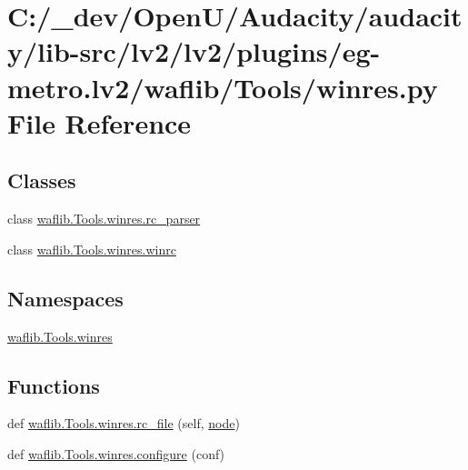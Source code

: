 \hypertarget{lv2_2plugins_2eg-metro_8lv2_2waflib_2_tools_2winres_8py}{}\section{C\+:/\+\_\+dev/\+Open\+U/\+Audacity/audacity/lib-\/src/lv2/lv2/plugins/eg-\/metro.lv2/waflib/\+Tools/winres.py File Reference}
\label{lv2_2plugins_2eg-metro_8lv2_2waflib_2_tools_2winres_8py}
\subsection*{Classes}
\begin{DoxyCompactItemize}
\item 
class \hyperlink{classwaflib_1_1_tools_1_1winres_1_1rc__parser}{waflib.\+Tools.\+winres.\+rc\+\_\+parser}
\item 
class \hyperlink{classwaflib_1_1_tools_1_1winres_1_1winrc}{waflib.\+Tools.\+winres.\+winrc}
\end{DoxyCompactItemize}
\subsection*{Namespaces}
\begin{DoxyCompactItemize}
\item 
 \hyperlink{namespacewaflib_1_1_tools_1_1winres}{waflib.\+Tools.\+winres}
\end{DoxyCompactItemize}
\subsection*{Functions}
\begin{DoxyCompactItemize}
\item 
def \hyperlink{namespacewaflib_1_1_tools_1_1winres_ac3e0ca77b048ed70a3403f4bbda55f9e}{waflib.\+Tools.\+winres.\+rc\+\_\+file} (self, \hyperlink{structnode}{node})
\item 
def \hyperlink{namespacewaflib_1_1_tools_1_1winres_a61d49dde1a942da70092bb59fe817f18}{waflib.\+Tools.\+winres.\+configure} (conf)
\end{DoxyCompactItemize}
